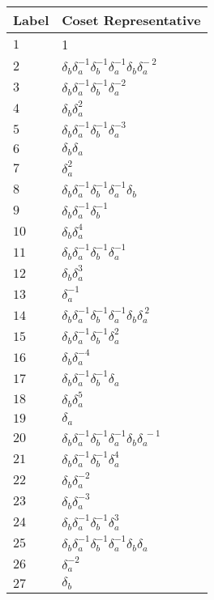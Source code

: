 \documentclass{article}
\begin{document}
\begin{center}
\begin{tabular}{ll}
\toprule
Label & Coset Representative\\
\midrule
$1$ & 1 \\
$2$ & $\delta_b^{}\delta_a^{-1}\delta_b^{-1}\delta_a^{-1}\delta_b^{}\delta_a^{-\
2}$ \\
$3$ & $\delta_b^{}\delta_a^{-1}\delta_b^{-1}\delta_a^{-2}$ \\
$4$ & $\delta_b^{}\delta_a^{2}$ \\
$5$ & $\delta_b^{}\delta_a^{-1}\delta_b^{-1}\delta_a^{-3}$ \\
$6$ & $\delta_b^{}\delta_a^{}$ \\
$7$ & $\delta_a^{2}$ \\
$8$ & $\delta_b^{}\delta_a^{-1}\delta_b^{-1}\delta_a^{-1}\delta_b^{}$ \\
$9$ & $\delta_b^{}\delta_a^{-1}\delta_b^{-1}$ \\
$10$ & $\delta_b^{}\delta_a^{4}$ \\
$11$ & $\delta_b^{}\delta_a^{-1}\delta_b^{-1}\delta_a^{-1}$ \\
$12$ & $\delta_b^{}\delta_a^{3}$ \\
$13$ & $\delta_a^{-1}$ \\
$14$ & $\delta_b^{}\delta_a^{-1}\delta_b^{-1}\delta_a^{-1}\delta_b^{}\delta_a^{\
2}$ \\
$15$ & $\delta_b^{}\delta_a^{-1}\delta_b^{-1}\delta_a^{2}$ \\
$16$ & $\delta_b^{}\delta_a^{-4}$ \\
$17$ & $\delta_b^{}\delta_a^{-1}\delta_b^{-1}\delta_a^{}$ \\
$18$ & $\delta_b^{}\delta_a^{5}$ \\
$19$ & $\delta_a^{}$ \\
$20$ & $\delta_b^{}\delta_a^{-1}\delta_b^{-1}\delta_a^{-1}\delta_b^{}\delta_a^{\
-1}$ \\
$21$ & $\delta_b^{}\delta_a^{-1}\delta_b^{-1}\delta_a^{4}$ \\
$22$ & $\delta_b^{}\delta_a^{-2}$ \\
$23$ & $\delta_b^{}\delta_a^{-3}$ \\
$24$ & $\delta_b^{}\delta_a^{-1}\delta_b^{-1}\delta_a^{3}$ \\
$25$ & $\delta_b^{}\delta_a^{-1}\delta_b^{-1}\delta_a^{-1}\delta_b^{}\delta_a^{\
}$ \\
$26$ & $\delta_a^{-2}$ \\
$27$ & $\delta_b^{}$ \\

\end{tabular}
\end{center}
\end{document}

